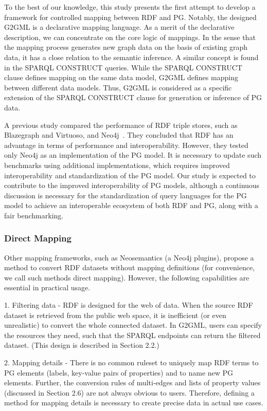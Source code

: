 \documentclass[runningheads]{llncs}
\begin{document}
To the best of our knowledge, this study presents the first attempt to develop a framework for controlled mapping between RDF and PG. 
Notably, the designed G2GML is a declarative mapping language. 
As a merit of the declarative description, we can concentrate on the core logic of mappings. In the sense that the mapping process generates new graph data on the basis of existing graph data, it has a close relation to the semantic inference. A similar concept is found in the SPARQL CONSTRUCT queries. While the SPARQL CONSTRUCT clause defines mapping on the same data model, G2GML defines mapping between different data models. 
Thus, G2GML is considered as a specific extension of the SPARQL CONSTRUCT clause for generation or inference of PG data.

A previous study compared the performance of RDF triple stores, such as Blazegraph and Virtuoso, and Neo4j~\cite{alocci}. They concluded that RDF has an advantage in terms of performance and interoperability. However, they tested only Neo4j as an implementation of the PG model. It is necessary to update such benchmarks using additional implementations, which requires improved interoperability and standardization of the PG model. Our study is expected to contribute to the improved interoperability of PG models, although a continuous discussion is necessary for the standardization of query languages for the PG model to achieve an interoperable ecosystem of both RDF and PG, along with a fair benchmarking.


\subsubsection{Direct Mapping}

Other mapping frameworks, such as Neosemantics (a Neo4j plugins), propose a method to convert RDF datasets without mapping definitions (for convenience, we call such methods direct mapping). However, the following capabilities are essential in practical usage.

1. Filtering data - RDF is designed for the web of data. When the source RDF dataset is retrieved from the public web space, it is inefficient (or even unrealistic) to convert the whole connected dataset. In G2GML, users can specify the resources they need, such that the SPARQL endpoints can return the filtered dataset. (This design is described in Section 2.2.)

2. Mapping details - There is no common ruleset to uniquely map RDF terms to PG elements (labels, key-value pairs of properties) and to name new PG elements. Further, the conversion rules of multi-edges and lists of property values (discussed in Section 2.6) are not always obvious to users. Therefore, defining a method for mapping details is necessary to create precise data in actual use cases.
\end{document}
